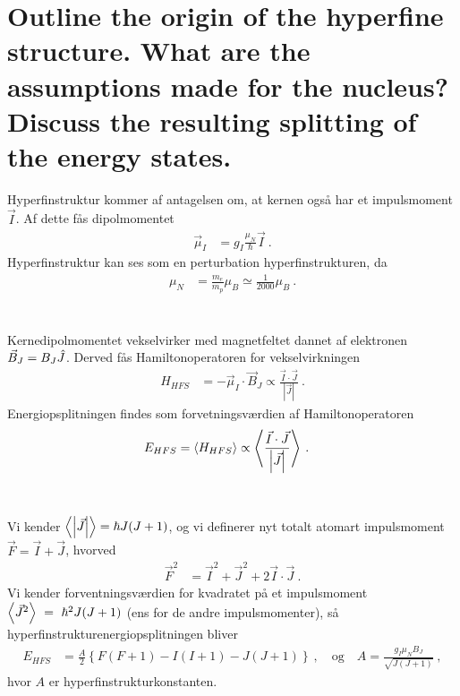 \section{Outline the origin of the hyperfine structure. What are the assumptions made for the nucleus? Discuss the resulting splitting of the energy states.}

\noindent
\large
Hyperfinstruktur kommer af antagelsen om, at kernen også har et impulsmoment $\Vec{I}$. Af dette fås dipolmomentet
\begin{align*}
    \Vec{\mu}_I &= g_I \frac{\mu_N}{\hbar} \Vec{I} \: .
\end{align*}
Hyperfinstruktur kan ses som en perturbation hyperfinstrukturen, da
\begin{align*}
    \mu_N &= \frac{m_e}{m_p} \mu_B \simeq \frac{1}{2000}\mu_B \: .
\end{align*}\\\\
%
Kernedipolmomentet vekselvirker med magnetfeltet dannet af elektronen $\Vec{B}_J = B_J \Hat{J}$. Derved fås Hamiltonoperatoren for vekselvirkningen
\begin{align*}
    H_{HFS} &= - \Vec{\mu}_I \cdot \Vec{B}_J \propto \frac{\Vec{I}\cdot\Vec{J}}{|\Vec{J}|} \: .
\end{align*}
Energiopsplitningen findes som forvetningsværdien af Hamiltonoperatoren
\begin{align*}
    E_{HFS} &= \Braket{H_{HFS}} \propto \Braket{\frac{\Vec{I}\cdot\Vec{J}}{\abs{\Vec{J}}}} \: .
\end{align*}\\\\
%
Vi kender $\Braket{\abs{\Vec{J}}} = \hbar J(J+1)$, og vi definerer nyt totalt atomart impulsmoment $\Vec{F} = \Vec{I} + \Vec{J}$, hvorved
\begin{align*}
    \Vec{F}^2 &= \Vec{I}^2 + \Vec{J}^2 + 2\Vec{I}\cdot\Vec{J} \: .
\end{align*}
Vi kender forventningsværdien for kvadratet på et impulsmoment\\ $\Braket{\Vec{J}^2}~=~\hbar^2 J(J+1)$ (ens for de andre impulsmomenter), så hyperfinstrukturenergiopsplitningen bliver
\begin{align*}
    E_{HFS} &= \frac{A}{2} \left\{F(F+1) - I(I+1) -J(J+1)\right\} \: , \quad \text{og} \quad A = \frac{g_I \mu_N B_J}{\sqrt{J(J+1)}} \: ,
\end{align*}
hvor $A$ er hyperfinstrukturkonstanten.\\\\\newpage\noindent
